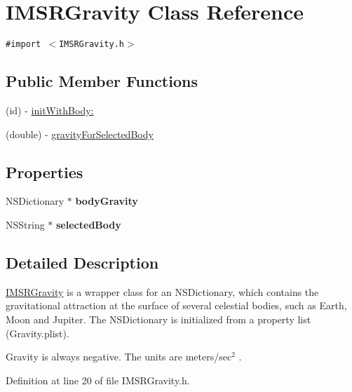 \hypertarget{interface_i_m_s_r_gravity}{
\section{IMSRGravity Class Reference}
\label{interface_i_m_s_r_gravity}
}
{\tt \#import $<$IMSRGravity.h$>$}

\subsection*{Public Member Functions}
\begin{CompactItemize}
\item 
(id) - \hyperlink{interface_i_m_s_r_gravity_8b103c80cb67a994c8bcaefe0aca3b4f}{initWithBody:}
\item 
(double) - \hyperlink{interface_i_m_s_r_gravity_98e01aca71f1f3c91a769b2bb8571ff5}{gravityForSelectedBody}
\end{CompactItemize}
\subsection*{Properties}
\begin{CompactItemize}
\item 
\hypertarget{interface_i_m_s_r_gravity_c80d0693a2a846db750fae929866d1a4}{
NSDictionary $\ast$ \textbf{bodyGravity}}
\label{interface_i_m_s_r_gravity_c80d0693a2a846db750fae929866d1a4}

\item 
\hypertarget{interface_i_m_s_r_gravity_f77d4563a9e7c7b7389391ec9043d98c}{
NSString $\ast$ \textbf{selectedBody}}
\label{interface_i_m_s_r_gravity_f77d4563a9e7c7b7389391ec9043d98c}

\end{CompactItemize}


\subsection{Detailed Description}
\hyperlink{interface_i_m_s_r_gravity}{IMSRGravity} is a wrapper class for an NSDictionary, which contains the gravitational attraction at the surface of several celestial bodies, such as Earth, Moon and Jupiter. The NSDictionary is initialized from a property list (Gravity.plist).

Gravity is always negative. The units are meters/sec$^{\mbox{2}}$ . 

Definition at line 20 of file IMSRGravity.h.

